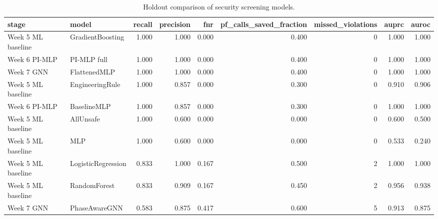 \begin{table}
\caption{Holdout comparison of security screening models.}
\label{tab:model_comparison}
\begin{tabular}{llrrrrrrr}
\toprule
stage & model & recall & precision & fnr & pf_calls_saved_fraction & missed_violations & auprc & auroc \\
\midrule
Week 5 ML baseline & GradientBoosting & 1.000 & 1.000 & 0.000 & 0.400 & 0 & 1.000 & 1.000 \\
Week 6 PI-MLP & PI-MLP full & 1.000 & 1.000 & 0.000 & 0.400 & 0 & 1.000 & 1.000 \\
Week 7 GNN & FlattenedMLP & 1.000 & 1.000 & 0.000 & 0.400 & 0 & 1.000 & 1.000 \\
Week 5 ML baseline & EngineeringRule & 1.000 & 0.857 & 0.000 & 0.300 & 0 & 0.910 & 0.906 \\
Week 6 PI-MLP & BaselineMLP & 1.000 & 0.857 & 0.000 & 0.300 & 0 & 1.000 & 1.000 \\
Week 5 ML baseline & AllUnsafe & 1.000 & 0.600 & 0.000 & 0.000 & 0 & 0.600 & 0.500 \\
Week 5 ML baseline & MLP & 1.000 & 0.600 & 0.000 & 0.000 & 0 & 0.533 & 0.240 \\
Week 5 ML baseline & LogisticRegression & 0.833 & 1.000 & 0.167 & 0.500 & 2 & 1.000 & 1.000 \\
Week 5 ML baseline & RandomForest & 0.833 & 0.909 & 0.167 & 0.450 & 2 & 0.956 & 0.938 \\
Week 7 GNN & PhaseAwareGNN & 0.583 & 0.875 & 0.417 & 0.600 & 5 & 0.913 & 0.875 \\
\bottomrule
\end{tabular}
\end{table}
